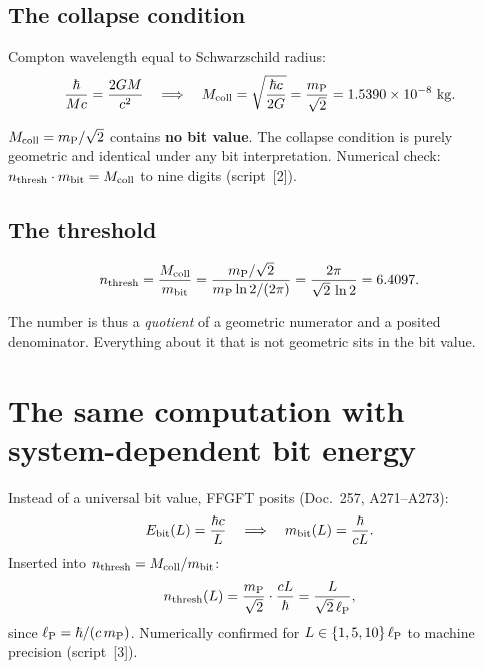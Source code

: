 \subsection{The collapse condition}

Compton wavelength equal to Schwarzschild radius:
\begin{equation}
  \frac{\hbar}{Mc} = \frac{2GM}{c^2}
  \quad\Longrightarrow\quad
  M_{\mathrm{coll}} = \sqrt{\frac{\hbar c}{2G}} = \frac{m_{\mathrm{P}}}{\sqrt{2}}
         = 1.5390\times10^{-8}~\mathrm{kg}.
\end{equation}

\begin{tcolorbox}[proofbox, title={The scale-independent core \B}]
  $M_{\mathrm{coll}} = m_{\mathrm{P}}/\sqrt{2}$ contains \textbf{no bit value}.
  The collapse condition is purely geometric and identical under any
  bit interpretation. Numerical check:
  $n_{\mathrm{thresh}} \cdot m_{\mathrm{bit}} = M_{\mathrm{coll}}$ to nine digits (script~[2]).
\end{tcolorbox}

\subsection{The threshold}

\begin{equation}
  n_{\mathrm{thresh}} = \frac{M_{\mathrm{coll}}}{m_{\mathrm{bit}}}
        = \frac{m_{\mathrm{P}}/\sqrt{2}}{m_{\mathrm{P}}\ln 2/(2\pi)}
        = \frac{2\pi}{\sqrt{2}\,\ln 2}
        = 6.4097 .
\end{equation}

The number is thus a \emph{quotient} of a geometric numerator and a
posited denominator. Everything about it that is not geometric sits in
the bit value.

\section{The same computation with system-dependent bit energy}

Instead of a universal bit value, FFGFT posits (Doc.~257, A271--A273):
\begin{equation}
  E_{\mathrm{bit}}(L) = \frac{\hbar c}{L}
  \quad\Longrightarrow\quad
  m_{\mathrm{bit}}(L) = \frac{\hbar}{cL}.
\end{equation}
Inserted into $n_{\mathrm{thresh}} = M_{\mathrm{coll}}/m_{\mathrm{bit}}$:
\begin{equation}
  n_{\mathrm{thresh}}(L) = \frac{m_{\mathrm{P}}}{\sqrt{2}} \cdot \frac{cL}{\hbar}
           = \frac{L}{\sqrt{2}\,\ell_{\mathrm{P}}},
\end{equation}
since $\ell_{\mathrm{P}} = \hbar/(c\,m_{\mathrm{P}})$. Numerically confirmed for
$L \in \{1, 5, 10\}\,\ell_{\mathrm{P}}$ to machine precision (script~[3]). \B

